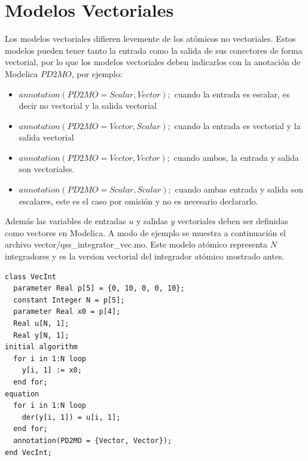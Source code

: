 \section{Modelos Vectoriales}
Los modelos vectoriales difieren levemente de los atómicos no vectoriales. Estos modelos pueden tener tanto la entrada como la salida de sus conectores de forma vectorial, por lo que los modelos vectoriales deben indicarlos con la anotación de Modelica $PD2MO$, por ejemplo:
\begin{itemize}
\item $annotation(PD2MO = {Scalar, Vector});$ cuando la entrada es escalar, es decir no vectorial y la salida vectorial
\item $annotation(PD2MO = {Vector, Scalar});$ cuando la entrada es vectorial y la salida vectorial
\item $annotation(PD2MO = {Vector, Vector});$ cuando ambos, la entrada y salida son vectoriales.
\item $annotation(PD2MO = {Scalar, Scalar});$ cuando ambas entrada y salida son escalares, este es el caso por omisión y no es necesario declararlo.
\end{itemize}

Además las variables de entradas $u$ y salidas $y$ vectoriales deben ser definidas como vectores en Modelica. A modo de ejemplo se muestra a continuación el archivo vector/qss\_integrator\_vec.mo. Este modelo atómico representa $N$ integradores y es la version vectorial del integrador atómico mostrado antes.

\begin{verbatim}
class VecInt
  parameter Real p[5] = {0, 10, 0, 0, 10};
  constant Integer N = p[5];
  parameter Real x0 = p[4];
  Real u[N, 1];
  Real y[N, 1];
initial algorithm
  for i in 1:N loop
    y[i, 1] := x0;
  end for;
equation
  for i in 1:N loop
    der(y[i, 1]) = u[i, 1];
  end for;
  annotation(PD2MO = {Vector, Vector});
end VecInt;
\end{verbatim}


